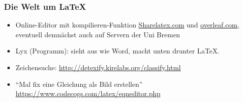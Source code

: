 \begin{frame}
\frametitle{Die Welt um \LaTeX}
\begin{itemize}
\item Online-Editor mit kompilieren-Funktion \url{Sharelatex.com} und \url{overleaf.com}, eventuell demnächst auch auf Servern der Uni Bremen
\item Lyx (Programm): sieht aus wie Word, macht unten drunter \LaTeX.
\item Zeichensuche: \url{http://detexify.kirelabs.org/classify.html}
\item \enquote{Mal fix eine Gleichung als Bild erstellen} \url{https://www.codecogs.com/latex/eqneditor.php}
\end{itemize}
\end{frame}
